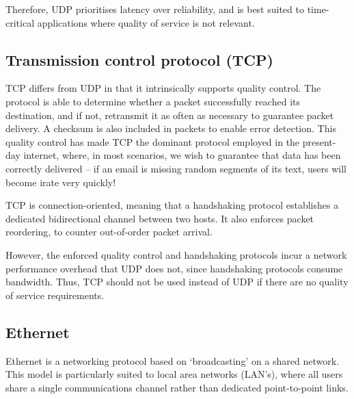 \documentclass[aps,rmp,twocolumn,amsmath,amssymb,nofootinbib,superscriptaddress]{revtex4}
\begin{document}
Therefore, UDP prioritises latency over reliability, and is best suited to time-critical applications where quality of service is not relevant.

%
%

\subsection{Transmission control protocol (TCP)} \label{sec:TCP}

TCP differs from UDP in that it intrinsically supports quality control. The protocol is able to determine whether a packet successfully reached its destination, and if not, retransmit it as often as necessary to guarantee packet delivery. A checksum is also included in packets to enable error detection. This quality control has made TCP the dominant protocol employed in the present-day internet, where, in most scenarios, we wish to guarantee that data has been correctly delivered -- if an email is missing random segments of its text, users will become irate very quickly!

TCP is connection-oriented, meaning that a handshaking protocol establishes a dedicated bidirectional channel between two hosts. It also enforces packet reordering, to counter out-of-order packet arrival.

However, the enforced quality control and handshaking protocols incur a network performance overhead that UDP does not, since handshaking protocols consume bandwidth. Thus, TCP should not be used instead of UDP if there are no quality of service requirements.

%
%

\subsection{Ethernet}

Ethernet is a networking protocol based on `broadcasting' on a shared network. This model is particularly suited to local area networks (LAN's), where all users share a single communications channel rather than dedicated point-to-point links.
\end{document}
